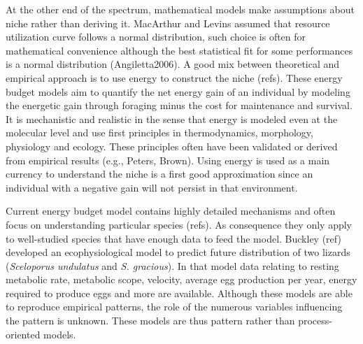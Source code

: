 At the other end of the spectrum, mathematical models make assumptions about niche rather than deriving it. 
MacArthur and Levins assumed that resource utilization curve follows a normal distribution, such choice is often for mathematical convenience although the best statistical fit for some performances is a normal distribution (Angiletta2006). 
A good mix between theoretical and empirical approach is to use energy to construct the niche (refs).
These energy budget models aim to quantify the net energy gain of an individual by modeling the energetic gain through foraging minus the cost for maintenance and survival.
It is mechanistic and realistic in the sense that energy is modeled even at the molecular level and use first principles in thermodynamics, morphology, physiology and ecology.
These principles often have been validated or derived from empirical results (e.g., Peters, Brown).
Using energy is used as a main currency to understand the niche is a first good approximation since an individual with a negative gain will not persist in that environment.


Current energy budget model contains highly detailed mechanisms and often focus on understanding particular species (refs).
As consequence they only apply to well-studied species that have enough data to feed the model.
Buckley (ref) developed an ecophysiological model to predict future distribution of two lizards (\textit{Sceloporus undulatus} and \textit{S. gracious}).
In that model data relating to resting metabolic rate, metabolic scope, velocity, average egg production per year, energy required to produce eggs and more are available.
Although these models are able to reproduce empirical patterns, the role of the numerous variables influencing the pattern is unknown.
These models are thus pattern rather than process-oriented models.


